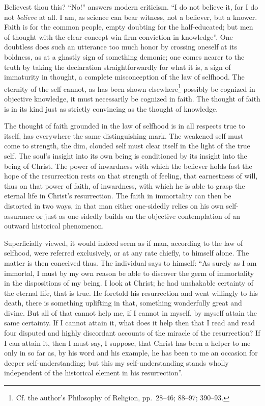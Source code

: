\documentclass[12pt,a4paper,openany]{book}
\newcommand{\opage}[1]{\marginnote{\footnotesize\textit{[#1]}}}
\begin{document}
Believest thou this?  ``No!'' answers modern criticism.
``I do not believe it, for I do not \emph{believe} at all.  I am, as
science can bear witness, not a believer, but a knower.
Faith is for the common people, empty doubting for the half-educated;
but men of thought with the clear concept win
firm conviction in knowledge''.  One doubtless does such
an utterance too much honor by crossing oneself at
its boldness, as at a ghastly sign of something
demonic; one comes nearer to the truth by taking
the declaration straightforwardly for what it is, a sign of
immaturity in thought, a complete misconception of
the law of selfhood.  The eternity of the self cannot, as has been shown elsewhere\footnote[1]{Cf. the author's Philosophy of Religion, pp.\ 28--46; 88--97; 390--93.}
possibly be cognized in objective knowledge, it must
\setcounter{footnote}{0}%
\opage{213}necessarily be cognized in faith.  The thought of faith is in its kind
just as strictly convincing as the thought of knowledge.

The thought of faith grounded in the law of selfhood is in all
respects true to itself, has everywhere the same distinguishing mark.  The
weakened self must come to strength, the dim, clouded
self must clear itself in the light of the true self.
The soul's insight into its own being is conditioned by its insight
into the being of Christ.  The power of inwardness with which
the believer holds fast the hope of the resurrection rests on that
strength of feeling, that earnestness of will, thus on that power of
faith, of inwardness, with which he is able to grasp the
eternal life in Christ's resurrection.  The faith in immortality can
then be distorted in two ways, in that man either one-sidedly
relies on his own self-assurance or just as one-sidedly
builds on the objective contemplation of an outward historical
phenomenon.

Superficially viewed, it would indeed seem as if man,
according to the law of selfhood, were referred exclusively, or at any rate chiefly,
to himself alone.  The matter is then
conceived thus.  The individual says to himself: ``As
surely as I am immortal, I must by my own reason be
able to discover the germ of immortality in the
dispositions of my being.  I look at Christ; he had unshakable certainty
of the eternal life, that is true.  He foretold
his resurrection and went willingly to his death, there is something
uplifting in that, something wonderfully great and divine.
But all of that cannot help me, if I cannot
in myself, by myself attain the same certainty.
If I cannot attain it, what does it help then that I
read and read four disputed and highly discordant
accounts of the miracle of the resurrection?  If I can attain
\setcounter{footnote}{0}%
\opage{214}it, then I must say, I suppose, that Christ has been a helper to me only in so far as, by his word and his example, he
has been to me an occasion for deeper self-understanding;
but this my self-understanding stands wholly
independent of the historical element in his resurrection''.
\end{document}

